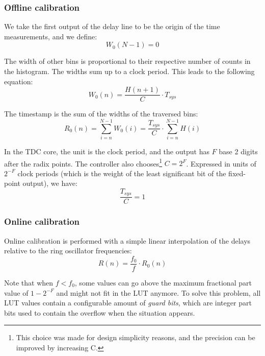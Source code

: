 \documentclass[a4paper,11pt]{article}
\begin{document}
\subsubsection{Offline calibration}
We take the first output of the delay line to be the origin of the time measurements, and we define:
\begin{equation}
W_{0}(N-1) = 0
\end{equation}

The width of other bins is proportional to their respective number of counts in the histogram. The widths sum up to a clock period. This leads to the following equation:
\begin{equation}
W_{0}(n) = \frac{H(n+1)}{C} \cdot T_{sys}
\end{equation}

The timestamp is the sum of the widths of the traversed bins:
\begin{equation}
R_{0}(n) = \displaystyle\sum\limits_{i=n}^{N-1}{W_{0}(i)} = \frac{T_{sys}}{C} \cdot \displaystyle\sum\limits_{i=n}^{N-1}{H(i)}
\end{equation}

In the TDC core, the unit is the clock period, and the output has $F$ base 2 digits after the radix points. The controller also chooses\footnote{This choice was made for design simplicity reasons, and the precision can be improved by increasing C.} $C=2^F$. Expressed in units of $2^{-F}$ clock periods (which is the weight of the least significant bit of the fixed-point output), we have:
\begin{equation}
\frac{T_{sys}}{C}=1
\end{equation}

\subsubsection{Online calibration}
Online calibration is performed with a simple linear interpolation of the delays relative to the ring oscillator frequencies:
\begin{equation}
R(n) = \frac{f_{0}}{f} \cdot R_{0}(n)
\end{equation}

Note that when $f < f_{0}$, some values can go above the maximum fractional part value of $1 - 2^{-F}$ and might not fit in the LUT anymore. To solve this problem, all LUT values contain a configurable amount of \textit{guard bits}, which are integer part bits used to contain the overflow when the situation appears.
\end{document}
